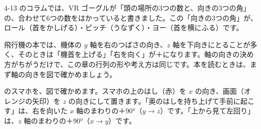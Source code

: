4-13 のコラムでは、VR ゴーグルが「頭の場所の3つの数と、向きの3つの角」の、合わせて6つの数をはかっていると書きました。この「向きの3つの角」が、ロール（首をかしげる）・ピッチ（うなずく）・ヨー（首を横にふる）です。

\begin{seikaku}
飛行機の本では、機体の $y$ 軸を右のつばさの向き、$z$ 軸を下向きにとることが多く、そのときは「機首を上げる」「右を向く」が＋になります。軸の向きの決め方がちがうだけで、この章の行列の形や考え方は同じです。本を読むときは、まず軸の向きを図で確かめましょう。
\end{seikaku}


\label{bk:7-7:junban}\bkhatenaref のスマホを、図で確かめます。スマホの上のはし（赤）を $x$ の向き、画面（オレンジの矢印）を $z$ の向きにして置きます。「奥のはしを持ち上げて手前に起こす」は、右を向いた $x$ 軸のまわりの＋90°（$y\to z$）です。「上から見て左回り」は、$z$ 軸のまわりの＋90°（$x\to y$）です。

